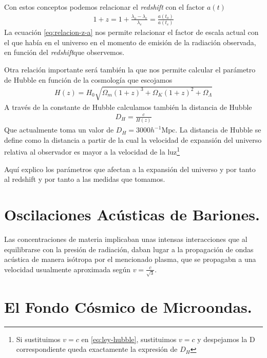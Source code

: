Con estos conceptos podemos relacionar el \textit{redshift} con el factor $a(t)$ 
\begin{align}
	1+z = 1+  \frac{\lambda_o - \lambda_e}{\lambda_e} = \frac{a(t_o)}{a(t_e)}
	\label{eq:relacion-z-a}
\end{align}
La ecuación \eqref{eq:relacion-z-a} nos permite relacionar el factor de escala actual con el que había en el universo en el momento de emisión de la radiación observada, en función del \textit{redshift}que observemos.

Otra relación importante será también la que nos permite calcular el parámetro de Hubble en función de la cosmología que escojamos 
\begin{align}
	H(z) = H_0 \sqrt{\Omega_m(1+z)^3 + \Omega_K(1+z)^2 + \Omega_\Lambda} 
\end{align}
A través de la constante de Hubble calculamos también la distancia de Hubble 
\begin{align}
	D_H = \frac{c}{H(z)}
	\label{eq:distancia-hubble}
\end{align}
Que actualmente toma un valor de $D_H = 3000h^{-1}\text{Mpc}$. La distancia de Hubble se define como la distancia a partir de la cual la velocidad de expansión del universo relativa al observador es mayor a la velocidad de la luz\footnote{Si sustituimos $v=c$ en \eqref{eq:ley-hubble}, sustituimos $v=c$ y despejamos la D correspondiente queda exactamente la expresión de $D_H$}


Aquí explico los parámetros que afectan a la expansión del universo y por tanto al redshift y por tanto a las medidas que tomamos.



\section{Oscilaciones Acústicas de Bariones.}
Las concentraciones de materia implicaban unas intensas interacciones que al equilibrarse con la presión de radiación, daban lugar a la propagación de ondas acústica de manera isótropa por el mencionado plasma, que se propagabn a una velocidad usualmente aproximada según $v = \frac{c}{\sqrt{3} }$. 

\section{El Fondo Cósmico de Microondas.}

